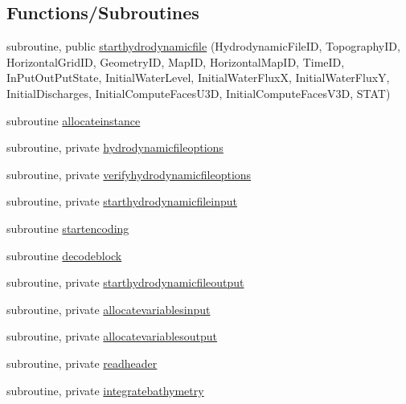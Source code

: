 \subsection*{Functions/\+Subroutines}
\begin{DoxyCompactItemize}
\item 
subroutine, public \mbox{\hyperlink{namespacemodulehydrodynamicfile_afa04d9ff5074b735139f9addb9b466d7}{starthydrodynamicfile}} (Hydrodynamic\+File\+ID, Topography\+ID, Horizontal\+Grid\+ID, Geometry\+ID, Map\+ID, Horizontal\+Map\+ID, Time\+ID, In\+Put\+Out\+Put\+State, Initial\+Water\+Level, Initial\+Water\+FluxX, Initial\+Water\+FluxY, Initial\+Discharges, Initial\+Compute\+Faces\+U3D, Initial\+Compute\+Faces\+V3D, S\+T\+AT)
\item 
subroutine \mbox{\hyperlink{namespacemodulehydrodynamicfile_a5235543e6aa405ed126b0ca0fdf38961}{allocateinstance}}
\item 
subroutine, private \mbox{\hyperlink{namespacemodulehydrodynamicfile_a091307ffd36898af46af80552e9243ab}{hydrodynamicfileoptions}}
\item 
subroutine, private \mbox{\hyperlink{namespacemodulehydrodynamicfile_acd3245c0ac200350cf4d9bd623090e6b}{verifyhydrodynamicfileoptions}}
\item 
subroutine, private \mbox{\hyperlink{namespacemodulehydrodynamicfile_aab72ffaa67d987e2e0df7cd6249eac99}{starthydrodynamicfileinput}}
\item 
subroutine \mbox{\hyperlink{namespacemodulehydrodynamicfile_a45b05c777eb42ae5c5d23981ba6256da}{startencoding}}
\item 
subroutine \mbox{\hyperlink{namespacemodulehydrodynamicfile_ae7f1a97acd1cc5b22e6ff9e638243e70}{decodeblock}}
\item 
subroutine, private \mbox{\hyperlink{namespacemodulehydrodynamicfile_a782ea415676eeb21e1368c0c2dd1e710}{starthydrodynamicfileoutput}}
\item 
subroutine, private \mbox{\hyperlink{namespacemodulehydrodynamicfile_ac67e9023c973dadd99ed3b893b1cc9ad}{allocatevariablesinput}}
\item 
subroutine, private \mbox{\hyperlink{namespacemodulehydrodynamicfile_a395d8802270df14831dc0865064f36c1}{allocatevariablesoutput}}
\item 
subroutine, private \mbox{\hyperlink{namespacemodulehydrodynamicfile_a6d9975e28fbe49117eab154fe46cdeca}{readheader}}
\item 
subroutine, private \mbox{\hyperlink{namespacemodulehydrodynamicfile_ae3afcd841fecf4aa1c250de0db5419e7}{integratebathymetry}}

\end{DoxyCompactItemize}
